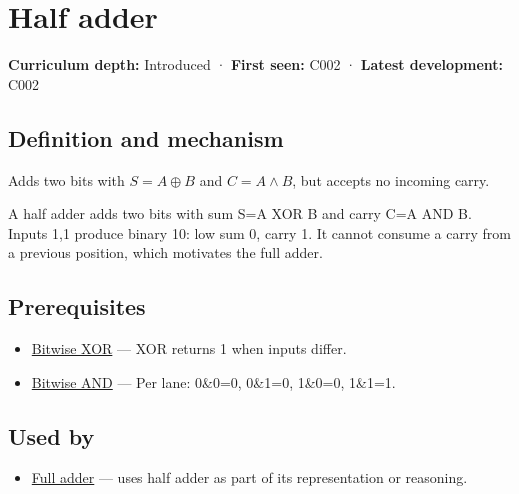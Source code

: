 \hypertarget{appendix-1652d27a8e90}{}\label{referencestart:appendix-1652d27a8e90}
\section{Half adder}\label{appendix-1652d27a8e90-half-adder}

\textbf{Curriculum depth:} Introduced · \textbf{First seen:} C002 · \textbf{Latest development:} C002

\begin{allmightroledefinition}

\subsection{Definition and mechanism}\label{appendix-1652d27a8e90-definition-and-mechanism}

Adds two bits with \(S=A\oplus B\) and \(C=A\land B\), but accepts no incoming carry.

\end{allmightroledefinition}

A half adder adds two bits with sum S=A XOR B and carry C=A AND B. Inputs 1,1 produce binary 10: low sum 0, carry 1. It cannot consume a carry from a previous position, which motivates the full adder.

\subsection{Prerequisites}\label{appendix-1652d27a8e90-prerequisites}

\begin{itemize}
\tightlist
\item
  \hyperref[appendix-d49161831368]{Bitwise XOR} --- XOR returns 1 when inputs differ.
\item
  \hyperref[appendix-68b52453737c]{Bitwise AND} --- Per lane: 0\&0=0, 0\&1=0, 1\&0=0, 1\&1=1.
\end{itemize}

\subsection{Used by}\label{appendix-1652d27a8e90-used-by}

\begin{itemize}
\tightlist
\item
  \hyperref[appendix-d1a5b1e520c2]{Full adder} --- uses half adder as part of its representation or reasoning.
\end{itemize}

